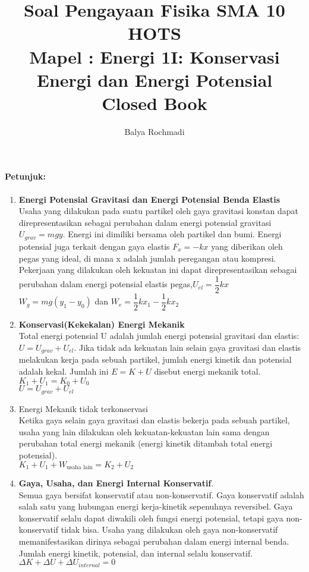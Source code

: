 \documentclass[12pt,a4paper,draft,final,oneside,twoside,openright,openany]{article}
\author{Balya Rochmadi}
\title{Soal Pengayaan Fisika SMA 10 HOTS\\Mapel : Energi 1I: Konservasi Energi dan Energi Potensial \\Closed Book}
\begin{document}
	\maketitle
	\large
	\noindent\makebox[\linewidth]{\rule{\paperwidth}{0.4pt}}
	\paragraph{Petunjuk:}
		\begin{enumerate}
			\item \textbf{Energi Potensial Gravitasi dan Energi Potensial Benda Elastis}\\
			Usaha yang dilakukan pada suatu partikel oleh gaya gravitasi konstan dapat direpresentasikan sebagai perubahan dalam energi potensial gravitasi $U_{grav} = mgy$. Energi ini dimiliki bersama oleh partikel dan bumi. Energi potensial juga terkait dengan gaya elastis $F_x = -kx$ yang diberikan oleh pegas yang ideal, di mana x adalah jumlah peregangan atau kompresi. Pekerjaan yang dilakukan oleh kekuatan ini dapat direpresentasikan sebagai perubahan dalam energi potensial elastis pegas,$U_{el}=\dfrac{1}{2}kx$\\
						$W_g=mg(y_1-y_0)$ dan $W_e=\dfrac{1}{2}kx_1-\dfrac{1}{2}kx_2$
			\item \textbf{Konservasi(Kekekalan) Energi Mekanik}\\
			Total energi potensial U adalah jumlah energi potensial gravitasi dan elastis: $U = U_{grav} + U_{el}$. Jika tidak ada kekuatan lain selain gaya gravitasi dan elastis melakukan kerja pada sebuah partikel, jumlah energi kinetik dan potensial adalah kekal. Jumlah ini $ E = K + U$ disebut energi mekanik total.\\
						$K_1+U_1=K_0+U_0$\\
						$U=U_{grav}+U_{el}$\\
			\item Energi Mekanik tidak terkonservasi\\
			Ketika gaya selain gaya gravitasi dan elastis bekerja pada sebuah partikel, usaha yang lain dilakukan oleh kekuatan-kekuatan lain sama dengan perubahan total energi mekanik (energi kinetik ditambah total energi potensial).\\
			
						$K_1+U_1+W_{\text{usaha lain}}=K_2+U_2$
			\item \textbf{Gaya, Usaha, dan Energi Internal Konservatif}.\\ 
			Semua gaya bersifat konservatif atau non-konservatif. Gaya konservatif adalah salah satu yang hubungan energi kerja-kinetik sepenuhnya reversibel. Gaya konservatif selalu dapat diwakili oleh fungsi energi potensial, tetapi gaya non-konservatif tidak bisa. Usaha yang dilakukan oleh gaya non-konservatif memanifestasikan dirinya sebagai perubahan dalam energi internal benda. Jumlah energi kinetik, potensial, dan internal selalu konservatif.\\
					$\Delta K+\Delta U+\Delta U_{internal}=0$
					

\end{enumerate}
\end{document}
